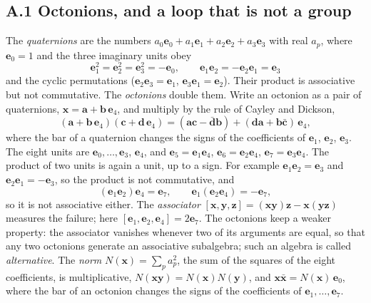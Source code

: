 \documentclass[
  10pt,
]{article}
\begin{document}
\hypertarget{a.1-octonions-and-a-loop-that-is-not-a-group}{%
\subsection{A.1 Octonions, and a loop that is not a
group}\label{a.1-octonions-and-a-loop-that-is-not-a-group}}

The \emph{quaternions} are the numbers
\(a_0\mathbf e_0+a_1\mathbf e_1+a_2\mathbf e_2+a_3\mathbf e_3\) with
real \(a_p\), where \(\mathbf e_0=1\) and the three imaginary units obey
\[\mathbf e_1^2=\mathbf e_2^2=\mathbf e_3^2=-\mathbf e_0,\qquad\mathbf e_1\mathbf e_2=-\mathbf e_2\mathbf e_1=\mathbf e_3\tag{A.1}\]
and the cyclic permutations (\(\mathbf e_2\mathbf e_3=\mathbf e_1\),
\(\mathbf e_3\mathbf e_1=\mathbf e_2\)). Their product is associative
but not commutative. The \emph{octonions} double them. Write an octonion
as a pair of quaternions,
\(\mathbf x=\mathbf a+\mathbf b\,\mathbf e_4\), and multiply by the rule
of Cayley and Dickson,
\[(\mathbf a+\mathbf b\,\mathbf e_4)(\mathbf c+\mathbf d\,\mathbf e_4)=(\mathbf a\mathbf c-\bar{\mathbf d}\mathbf b)+(\mathbf d\mathbf a+\mathbf b\bar{\mathbf c})\,\mathbf e_4,\tag{A.2}\]
where the bar of a quaternion changes the signs of the coefficients of
\(\mathbf e_1\), \(\mathbf e_2\), \(\mathbf e_3\). The eight units are
\(\mathbf e_0,\dots,\mathbf e_3\), \(\mathbf e_4\), and
\(\mathbf e_5=\mathbf e_1\mathbf e_4\),
\(\mathbf e_6=\mathbf e_2\mathbf e_4\),
\(\mathbf e_7=\mathbf e_3\mathbf e_4\). The product of two units is
again a unit, up to a sign. For example
\(\mathbf e_1\mathbf e_2=\mathbf e_{3}\) and
\(\mathbf e_2\mathbf e_1=-\mathbf e_{3}\), so the product is not
commutative, and
\[(\mathbf e_1\mathbf e_2)\mathbf e_4=\mathbf e_{7},\qquad\mathbf e_1(\mathbf e_2\mathbf e_4)=-\mathbf e_{7},\tag{A.3}\]
so it is not associative either. The \emph{associator}
\([\mathbf x,\mathbf y,\mathbf z]=(\mathbf x\mathbf y)\mathbf z-\mathbf x(\mathbf y\mathbf z)\)
measures the failure; here
\([\mathbf e_1,\mathbf e_2,\mathbf e_4]=2\mathbf e_{7}\). The octonions
keep a weaker property: the associator vanishes whenever two of its
arguments are equal, so that any two octonions generate an associative
subalgebra; such an algebra is called \emph{alternative}. The
\emph{norm} \(N(\mathbf x)=\sum_pa_p^2\), the sum of the squares of the
eight coefficients, is multiplicative,
\(N(\mathbf x\mathbf y)=N(\mathbf x)N(\mathbf y)\), and
\(\mathbf x\bar{\mathbf x}=N(\mathbf x)\,\mathbf e_0\), where the bar of
an octonion changes the signs of the coefficients of
\(\mathbf e_1,\dots,\mathbf e_7\).
\end{document}
